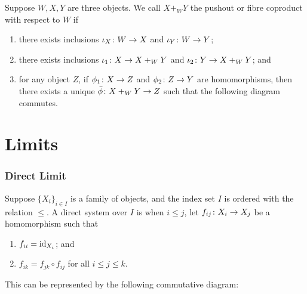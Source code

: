 \begin{definition}
    Suppose \(W,X,Y\) are three objects.
    We call \(X +_W Y\) the pushout or fibre coproduct with respect to \(W\) if
    \begin{enumerate}[label={(\roman*)}, itemsep=0mm]
        \item there exists inclusions \(\iota_X\colon W\to X\) and \(\iota_Y\colon W\to Y\);
        \item there exists inclusions \(\iota_1\colon X\to X +_W Y\)
            and \(\iota_2\colon Y\to X +_W Y\); and
        \item for any object \(Z\),
            if \(\phi_1\colon X\to Z\) and \(\phi_2\colon Z\to Y\) are homomorphisms,
            then there exists a unique \(\bar{\phi}\colon X +_W Y\to Z\)
            such that the following diagram commutes.
    \end{enumerate}
    \begin{center}
    \end{center}
\end{definition}


\section{Limits}

\subsubsection*{Direct Limit}

\begin{definition}
    Suppose \({\{X_i\}}_{i \in I}\) is a family of objects,
    and the index set \(I\) is ordered with the relation \(\leq\).
    A direct system over \(I\) is when \(i \leq j\),
    let \(f_{ij}\colon X_i\to X_j\) be a homomorphism such that
    \begin{enumerate}[label={(\roman*)}, itemsep=0mm]
        \item \(f_{ii} = \operatorname{id}_{X_i}\); and
        \item \(f_{ik} = f_{jk} \circ f_{ij}\) for all \(i \leq j \leq k\).
    \end{enumerate}

    This can be represented by the following commutative diagram:
    \begin{center}
    \end{center}
\end{definition}

